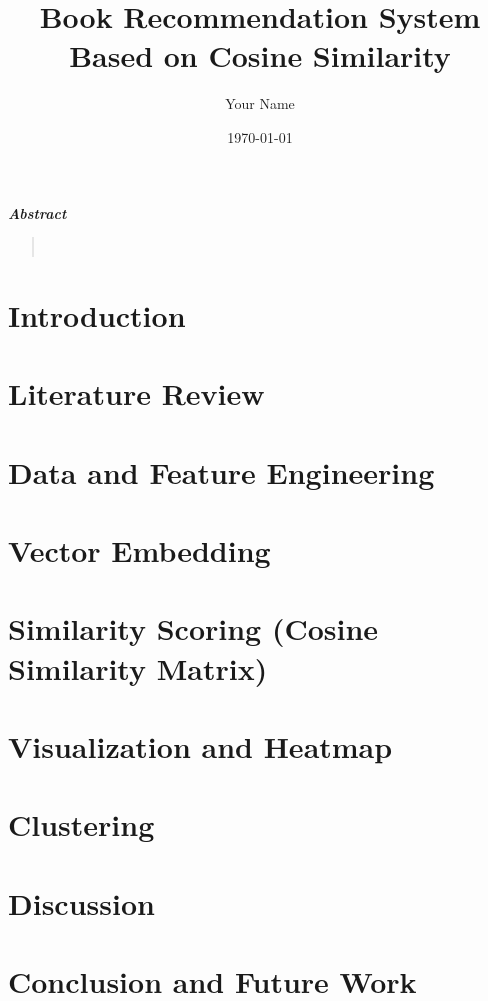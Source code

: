 \documentclass[12pt]{article}
\title{Book Recommendation System Based on Cosine Similarity}
\author{Your Name}
\date{\today}
\renewenvironment{abstract}{
	\cleardoublepage
	\thispagestyle{plain}
	\null\vfill
	\begin{center}
		\bfseries\large\textit{Abstract}
	\end{center}
	\vspace{1em}
	\begin{quote}
		\itshape
	}{
	\end{quote}
	\vfill\null
	\newpage
}
\begin{document}
	
	\maketitle
	
	\begin{abstract}
		
		~\cite{clusteringlikeapro}
	\end{abstract}
	
	\tableofcontents
	\newpage
	
	\section{Introduction}
	
	
	\section{Literature Review}
	
	
	\section{Data and Feature Engineering}
	
	
	\section{Vector Embedding}
	
	
	\section{Similarity Scoring (Cosine Similarity Matrix)}
	
	
	\section{Visualization and Heatmap}
	
	
	\section{Clustering} 
	
	
	\section{Discussion}
	
	
	\section{Conclusion and Future Work}
	
	
	
	
	
\end{document}
